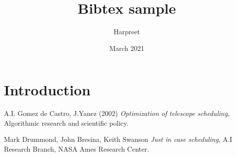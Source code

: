 \documentclass{article}
\title{Bibtex sample}
\author{Harpreet }
\date{March 2021}
\begin{document}
\maketitle

\section{Introduction}

\begin{thebibliography}{9}
A.I. Gomez de Castro, J.Yanez (2002) \emph{Optimization of telescope scheduling}, Algorithmic research and scientific policy.

Mark Drummond, John Bresina, Keith Swanson \emph{Just in case scheduling}, A.I Research Branch, NASA Ames Research Center.
\end{thebibliography}
\end{document}
